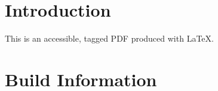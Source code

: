 \documentclass[11pt]{article}
\begin{document}

\section{Introduction}
This is an accessible, tagged PDF produced with \LaTeX.

\section{Build Information}
\BuildInfo
\end{document}
